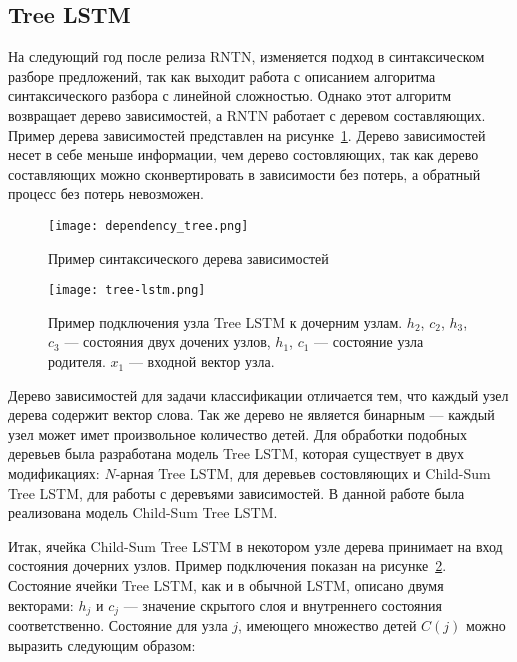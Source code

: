 \subsection{Tree LSTM}
На следующий год после релиза RNTN, изменяется подход в синтаксическом разборе предложений, так как выходит работа с описанием алгоритма синтаксического разбора с линейной сложностью. Однако этот алгоритм возвращает дерево зависимостей, а RNTN работает с деревом составляющих. Пример дерева зависимостей представлен на рисунке~\ref{fig:overview:dependency_tree}. Дерево зависимостей несет в себе меньше информации, чем дерево состовляющих, так как дерево составляющих можно сконвертировать в зависимости без потерь, а обратный процесс без потерь невозможен.

\begin{figure}[h]
\centering
  \texttt{[image: dependency\_tree.png]}
  \caption{Пример синтаксического дерева зависимостей}\label{fig:overview:dependency_tree}
\end{figure}

\begin{figure}[h]
\centering
  \texttt{[image: tree-lstm.png]}
  \caption{Пример подключения узла Tree LSTM к дочерним узлам. $h_2$, $c_2$, $h_3$, $c_3$ --- состояния двух дочених узлов, $h_1$, $c_1$ --- состояние узла родителя. $x_1$ --- входной вектор узла.}\label{fig:overview:tree_lstm}
\end{figure}

Дерево зависимостей для задачи классификации отличается тем, что каждый узел дерева содержит вектор слова. Так же дерево не является бинарным --- каждый узел может имет произвольное количество детей. Для обработки подобных деревьев была разработана модель Tree LSTM, которая существует в двух модификациях: $N$-арная Tree LSTM, для деревьев состовляющих и Child-Sum Tree LSTM, для работы с деревъями зависимостей. В данной работе была реализована модель Child-Sum Tree LSTM.

Итак, ячейка Child-Sum Tree LSTM в некотором узле дерева принимает на вход состояния дочерних узлов. Пример подключения показан на рисунке~\ref{fig:overview:tree_lstm}. Состояние ячейки Tree LSTM, как и в обычной LSTM, описано двумя векторами: $h_j$ и $c_j$ --- значение скрытого слоя и внутреннего состояния соответственно. Состояние для узла $j$, имеющего множество детей $C(j)$ можно выразить следующим образом:

